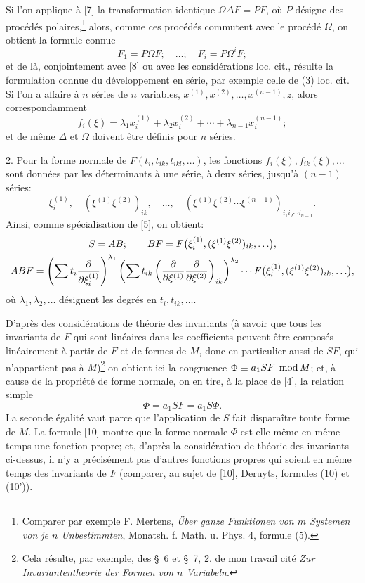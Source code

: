 Si l'on applique à [7] la transformation identique $\Omega\Delta F=PF$, où $P$ désigne des procédés polaires,\footnote{Comparer par exemple F. Mertens, \emph{Über ganze Funktionen von $m$ Systemen von je $n$ Unbestimmten}, Monatsh. f. Math. u. Phys. 4, formule (5).} alors, comme ces procédés commutent avec le procédé $\Omega$, on obtient la formule connue
\[
        F_1=P\Omega F;\quad\ldots;\quad F_i=P\Omega^iF;
\]
et de là, conjointement avec [8] ou avec les considérations loc. cit., résulte la formulation connue du développement en série, par exemple celle de (3) loc. cit. Si l'on a affaire à $n$ séries de $n$ variables, $x^{(1)},x^{(2)},\ldots,x^{(n-1)},z$, alors correspondamment
\[
        f_i(\xi)=\lambda_1x_i^{(1)}+\lambda_2x_i^{(2)}+\cdots+\lambda_{n-1}x_i^{(n-1)};
\]
et de même $\Delta$ et $\Omega$ doivent être définis pour $n$ séries.

2. Pour la forme normale de $F(t_i,t_{ik},t_{ikl},\ldots)$, les fonctions $f_i(\xi),f_{ik}(\xi),\ldots$ sont données par les déterminants à une série, à deux séries, jusqu'à $(n-1)$ séries:
\[
        \xi_i^{(1)},\quad (\xi^{(1)}\xi^{(2)})_{ik},\quad\ldots,\quad
        (\xi^{(1)}\xi^{(2)}\cdots\xi^{(n-1)})_{i_1i_2\cdots i_{n-1}}.
\]
Ainsi, comme spécialisation de [5], on obtient:
\[
\begin{gathered}
        S=AB;\qquad
        BF=F\bigl(\xi_i^{(1)},(\xi^{(1)}\xi^{(2)})_{ik},\ldots\bigr),\\
        ABF=\left(\sum t_i\frac{\partial}{\partial\xi_i^{(1)}}\right)^{\lambda_1}
        \left(\sum t_{ik}\left(\frac{\partial}{\partial\xi^{(1)}}\frac{\partial}{\partial\xi^{(2)}}\right)_{ik}\right)^{\lambda_2}
        \cdots F\bigl(\xi_i^{(1)},(\xi^{(1)}\xi^{(2)})_{ik},\ldots\bigr),
\end{gathered}
\]
où $\lambda_1,\lambda_2,\ldots$ désignent les degrés en $t_i,t_{ik},\ldots$.

D'après des considérations de théorie des invariants (à savoir que tous les invariants de $F$ qui sont linéaires dans les coefficients peuvent être composés linéairement à partir de $F$ et de formes de $M$, donc en particulier aussi de $SF$, qui n'appartient pas à $M$)\footnote{Cela résulte, par exemple, des \S~6 et \S~7, 2. de mon travail cité \emph{Zur Invariantentheorie der Formen von $n$ Variabeln}.} on obtient ici la congruence $\Phi\equiv a_1SF\;\operatorname{mod} M$; et, à cause de la propriété de forme normale, on en tire, à la place de [4], la relation simple
\begin{equation}
        \Phi=a_1SF=a_1S\Phi.
\tag{10}
\end{equation}
La seconde égalité vaut parce que l'application de $S$ fait disparaître toute forme de $M$. La formule [10] montre que la forme normale $\Phi$ est elle-même en même temps une fonction propre; et, d'après la considération de théorie des invariants ci-dessus, il n'y a précisément pas d'autres fonctions propres qui soient en même temps des invariants de $F$ (comparer, au sujet de [10], Deruyts, formules (10) et (10')).

